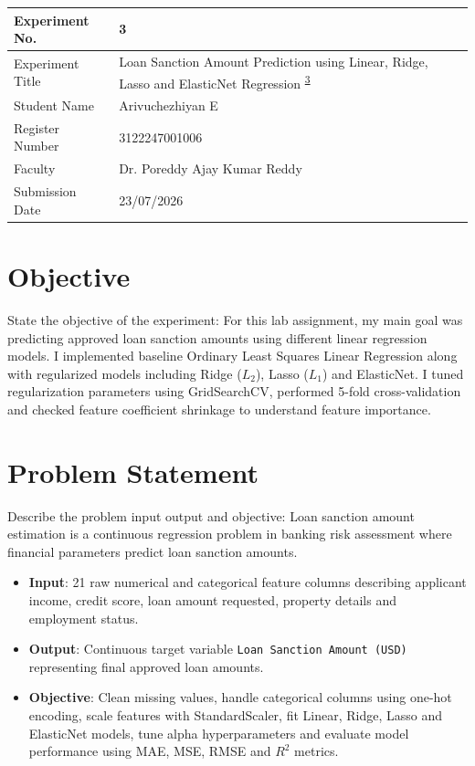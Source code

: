 \documentclass[12pt,a4paper]{article}
\begin{document}

\begin{tabular}{|p{4cm}|p{11cm}|}
\hline
Experiment No. & 3 \\ \hline
Experiment Title & Loan Sanction Amount Prediction using Linear, Ridge, Lasso and ElasticNet Regression \textsuperscript{\href{https://github.com/arivuchezhiyan/Machine_Learning/tree/main/experiment_3}{3}} \\ \hline
Student Name & Arivuchezhiyan E \\ \hline
Register Number & 3122247001006 \\ \hline
Faculty & Dr. Poreddy Ajay Kumar Reddy \\ \hline
Submission Date & 23/07/2026 \\ \hline
\end{tabular}

\section{Objective}
State the objective of the experiment:
For this lab assignment, my main goal was predicting approved loan sanction amounts using different linear regression models. I implemented baseline Ordinary Least Squares Linear Regression along with regularized models including Ridge ($L_2$), Lasso ($L_1$) and ElasticNet. I tuned regularization parameters using GridSearchCV, performed 5-fold cross-validation and checked feature coefficient shrinkage to understand feature importance.

\section{Problem Statement}
Describe the problem input output and objective:
Loan sanction amount estimation is a continuous regression problem in banking risk assessment where financial parameters predict loan sanction amounts.
\begin{itemize}
\item \textbf{Input}: 21 raw numerical and categorical feature columns describing applicant income, credit score, loan amount requested, property details and employment status.
\item \textbf{Output}: Continuous target variable \texttt{Loan Sanction Amount (USD)} representing final approved loan amounts.
\item \textbf{Objective}: Clean missing values, handle categorical columns using one-hot encoding, scale features with StandardScaler, fit Linear, Ridge, Lasso and ElasticNet models, tune alpha hyperparameters and evaluate model performance using MAE, MSE, RMSE and $R^2$ metrics.
\end{itemize}
\end{document}
